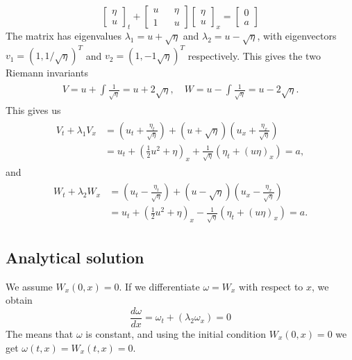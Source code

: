 \documentclass[11pt]{article}
\begin{document}
\begin{equation*}
\begin{bmatrix}
	\eta \\
	u
\end{bmatrix}_t
+
\begin{bmatrix}
u	&& 	\eta \\
1 	&&	u
\end{bmatrix}
\begin{bmatrix}
\eta\\
u
\end{bmatrix}_x
= 
\begin{bmatrix}
0\\
a
\end{bmatrix}
\end{equation*}
The matrix has eigenvalues $\lambda_1 = u + \sqrt{\eta}$ and $\lambda_2 = u - \sqrt{\eta}$, with eigenvectors $v_1 = (1,1/\sqrt{\eta})^T$ and $v_2 = (1, {-}1\sqrt{\eta})^T$ respectively. This gives the two Riemann invariants
\begin{align*}
	\begin{aligned}
		V = u + \int \frac{1}{\sqrt{\eta}} = u + 2\sqrt{\eta},\quad
		W = u - \int \frac{1}{\sqrt{\eta}} = u - 2\sqrt{\eta}.
	\end{aligned}
\end{align*}
This gives us
\begin{align}
\begin{aligned}
	\label{eq:shallowWaterRiemannV}
	V_t + \lambda_1V_x &= \left(u_t + \frac{\eta_t}{\sqrt{\eta}}\right) + (u + \sqrt{\eta})\left(u_x + \frac{\eta_x}{\sqrt \eta}\right)\\
	& = u_t + \left(\frac{1}{2}u^2 + \eta\right)_x + \frac{1}{\sqrt \eta}(\eta_t + (u\eta)_x) = a,
\end{aligned}
\end{align}
and
\begin{align}
	\label{eq:shallowWaterRiemannW}
	\begin{aligned}
		W_t + \lambda_2W_x &= \left(u_t - \frac{\eta_t}{\sqrt{\eta}}\right) + (u - \sqrt{\eta})\left(u_x - \frac{\eta_x}{\sqrt \eta}\right)\\
		& = u_t + \left(\frac{1}{2}u^2 + \eta\right)_x - \frac{1}{\sqrt \eta}(\eta_t + (u\eta)_x) = a.
	\end{aligned}
\end{align}
\subsection{Analytical solution}
We assume $W_x(0,x) = 0$. If we differentiate $\omega = W_x$ with respect to $x$, we obtain
\begin{equation}
	\frac{d \omega}{d x} = \omega_t + \left( \lambda_2 \omega_x \right) = 0
\end{equation}
The means that $\omega$ is constant, and using the initial condition $W_x(0,x) = 0$ we get $\omega(t,x) = W_x(t,x) = 0$.
\end{document}
